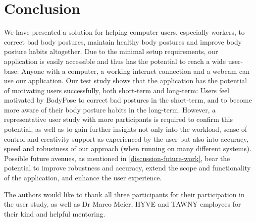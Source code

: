 \section{Conclusion} %
\label{conclusion}
We have presented a solution for helping computer users, especially workers, to correct bad body postures, maintain healthy body postures and improve body posture habits altogether. Due to the minimal setup requirements, our application is easily accessible and thus has the potential to reach a wide user-base: Anyone with a computer, a working internet connection and a webcam can use our application. Our test study shows that the application has the potential of motivating users successfully, both short-term and long-term: Users feel motivated by BodyPose to correct bad postures in the short-term, and to become more aware of their body posture habits in the long-term. However, a representative user study with more participants is required to confirm this potential, as well as to gain further insights not only into the workload, sense of control and creativity support as experienced by the user but also into accuracy, speed and robustness of our approach (when running on many different systems). Possible future avenues, as mentioned in \autoref{discussion-future-work}, bear the potential to improve robustness and accuracy, extend the scope and functionality of the application, and enhance the user experience.


\appendix


\begin{acks} %
  The authors would like to thank all three participants for their participation in the user study, as well as Dr Marco Meier, HYVE and TAWNY employees for their kind and helpful mentoring.
\end{acks}